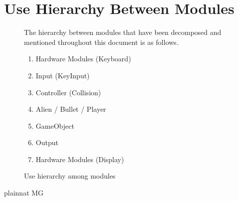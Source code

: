 \documentclass[12pt, titlepage]{article}
\begin{document}
\section{Use Hierarchy Between Modules} \label{SecUse}
\begin{figure}[H]
\centering
The hierarchy between modules that have been decomposed and mentioned throughout this document is as follows.
\begin{enumerate}
\item Hardware Modules (Keyboard)  
\item  Input (KeyInput) 
\item Controller (Collision) 
\item Alien / Bullet / Player 
\item GameObject 
\item Output 
\item Hardware Modules (Display)
\end{enumerate}
\caption{Use hierarchy among modules}
\label{FigUH}
\end{figure}
 {plainnat}
 {MG}
\end{document}
